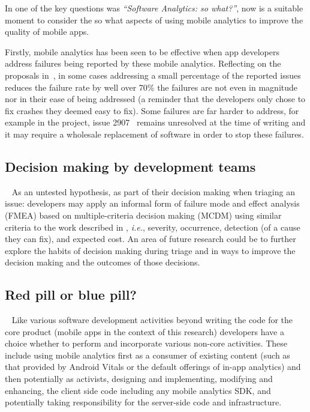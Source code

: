 In  one of the key questions was \emph{``Software Analytics: so what?''}, now is a suitable moment to consider the so what aspects of using mobile analytics to improve the quality of mobile apps. 

Firstly, mobile analytics has been seen to be effective when app developers address failures being reported by these mobile analytics. Reflecting on the proposals in~, in some cases addressing a small percentage of the reported issues reduces the failure rate by well over 70\% the failures are not even in magnitude nor in their ease of being addressed (a reminder that the  developers only chose to fix crashes they deemed easy to fix). Some failures are far harder to address, for example in the  project, issue 2907~ remains unresolved at the time of writing and it may require a wholesale replacement of software in order to stop these failures.


\subsection{Decision making by development teams}~\label{discussion-decision-making-by-dev-teams-section}
As an untested hypothesis, as part of their decision making when triaging an issue: developers may apply an informal form of failure mode and effect analysis (FMEA) based on multiple-criteria decision making (MCDM) using similar criteria to the work described in , \emph{i.e.}, severity, occurrence, detection (of a cause they can fix), and expected cost. An area of future research could be to further explore the habits of decision making during triage and in ways to improve the decision making and the outcomes of those decisions.


\subsection{Red pill or blue pill?}~\label{discussion-red-pill-or-blue-pill}
Like various software development activities beyond writing the code for the core product (mobile apps in the context of this research) developers have a choice whether to perform and incorporate various non-core activities. These include using mobile analytics first as a consumer of existing content (such as that provided by Android Vitals or the default offerings of in-app analytics) and then potentially as activists, designing and implementing, modifying and enhancing, the client side code including any mobile analytics SDK, and potentially taking responsibility for the server-side code and infrastructure. 

